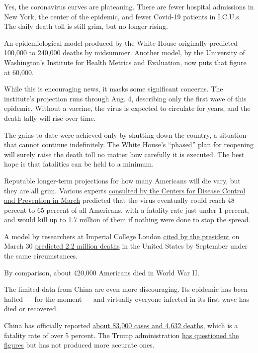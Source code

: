 Yes, the coronavirus curves are plateauing. There are fewer hospital
admissions in New York, the center of the epidemic, and fewer Covid-19
patients in I.C.U.s. The daily death toll is still grim, but no longer
rising.

An epidemiological model produced by the White House originally
predicted 100,000 to 240,000 deaths by midsummer. Another model, by the
University of Washington's Institute for Health Metrics and Evaluation,
now puts that figure at 60,000.

While this is encouraging news, it masks some significant concerns. The
institute's projection runs through Aug. 4, describing only the first
wave of this epidemic. Without a vaccine, the virus is expected to
circulate for years, and the death tally will rise over time.

The gains to date were achieved only by shutting down the country, a
situation that cannot continue indefinitely. The White House's
``phased'' plan for reopening will surely raise the death toll no matter
how carefully it is executed. The best hope is that fatalities can be
held to a minimum.

Reputable longer-term projections for how many Americans will die vary,
but they are all grim. Various experts
\href{https://www.nytimes.com/2020/03/13/us/coronavirus-deaths-estimate.html}{consulted
by the Centers for Disease Control and Prevention in March} predicted
that the virus eventually could reach 48 percent to 65 percent of all
Americans, with a fatality rate just under 1 percent, and would kill up
to 1.7 million of them if nothing were done to stop the spread.

A model by researchers at Imperial College London
\href{https://www.whitehouse.gov/briefings-statements/remarks-president-trump-vice-president-pence-members-coronavirus-task-force-press-briefing-14/}{cited
by the president} on March 30
\href{https://www.imperial.ac.uk/media/imperial-college/medicine/sph/ide/gida-fellowships/Imperial-College-COVID19-NPI-modelling-16-03-2020.pdf}{predicted
2.2 million deaths} in the United States by September under the same
circumstances.

By comparison, about 420,000 Americans died in World War II.

The limited data from China are even more discouraging. Its epidemic has
been halted --- for the moment --- and virtually everyone infected in
its first wave has died or recovered.

China has officially reported
\href{https://www.worldometers.info/coronavirus/}{about 83,000 cases and
4,632 deaths}, which is a fatality rate of over 5 percent. The Trump
administration
\href{https://www.nytimes.com/2020/04/02/us/politics/cia-coronavirus-china.html}{has
questioned the figures} but has not produced more accurate ones.

